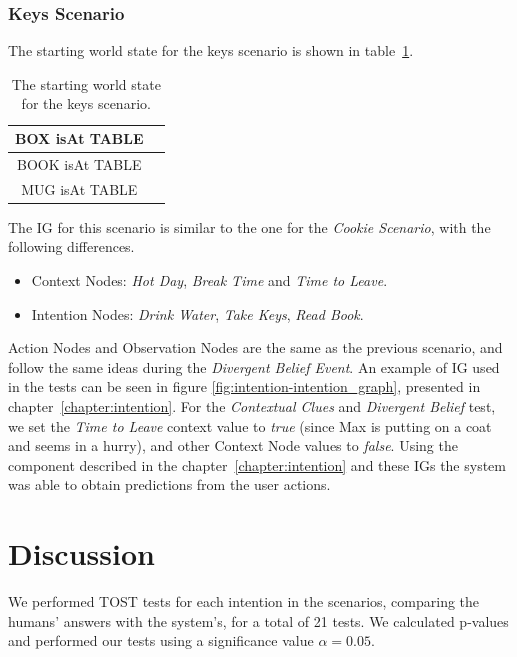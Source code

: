 \subsubsection{Keys Scenario}
The starting world state for the keys scenario is shown in table~\ref{table:observer_results-system_starting_state_keys}.

 \begin{table}[h!]
\centering
\scriptsize
\renewcommand{\arraystretch}{1.3}
\begin{tabular}{|c|c|}
\hline
BOX isAt TABLE    \\ \hline
BOOK isAt TABLE  \\ \hline
MUG isAt TABLE   \\ \hline
\end{tabular}
\caption[Starting World State for the Keys Scenario]{The starting world state for the keys scenario.}
 \label{table:observer_results-system_starting_state_keys}    
\end{table}

The IG for this scenario is similar to the one for the \textit{Cookie Scenario}, with the following differences.
\begin{itemize}
\item Context Nodes: \textit{Hot Day}, \textit{Break Time} and \textit{Time to Leave}.
\item Intention Nodes: \textit{Drink Water}, \textit{Take Keys}, \textit{Read Book}.
\end{itemize}

Action Nodes and Observation Nodes are the same as the previous scenario, and follow the same ideas during the \textit{Divergent Belief Event}. An example of IG used in the tests can be seen in figure \ref{fig:intention-intention_graph}, presented in chapter~\ref{chapter:intention}. For the \textit{Contextual Clues} and \textit{Divergent Belief} test, we set the \textit{Time to Leave} context value to \textit{true} (since Max is putting on a coat and seems in a hurry), and other Context Node values to \textit{false}. Using the component described in the chapter~\ref{chapter:intention} and these IGs the system was able to obtain predictions from the user actions.

\section{Discussion}
\label{sec:observer_experiment-discussion}
We performed TOST tests for each intention in the scenarios, comparing the humans' answers with the system's, for a total of 21 tests. We calculated p-values and performed our tests using a significance value $\alpha=0.05$.

